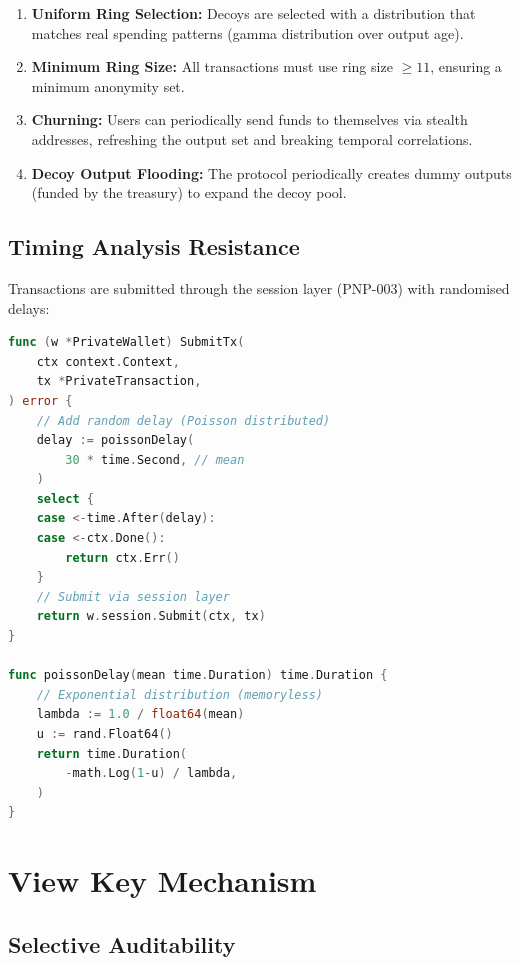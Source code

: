 \documentclass[11pt,a4paper]{article}
\begin{document}
\begin{enumerate}
    \item \textbf{Uniform Ring Selection:} Decoys are selected with a
    distribution that matches real spending patterns
    (gamma distribution over output age).

    \item \textbf{Minimum Ring Size:} All transactions must use ring
    size $\geq 11$, ensuring a minimum anonymity set.

    \item \textbf{Churning:} Users can periodically send funds to
    themselves via stealth addresses, refreshing the output set and
    breaking temporal correlations.

    \item \textbf{Decoy Output Flooding:} The protocol periodically
    creates dummy outputs (funded by the treasury) to expand the decoy
    pool.
\end{enumerate}

\subsection{Timing Analysis Resistance}

Transactions are submitted through the session layer (PNP-003) with
randomised delays:

\begin{lstlisting}[language=Go,caption={Timing Obfuscation}]
func (w *PrivateWallet) SubmitTx(
    ctx context.Context,
    tx *PrivateTransaction,
) error {
    // Add random delay (Poisson distributed)
    delay := poissonDelay(
        30 * time.Second, // mean
    )
    select {
    case <-time.After(delay):
    case <-ctx.Done():
        return ctx.Err()
    }
    // Submit via session layer
    return w.session.Submit(ctx, tx)
}

func poissonDelay(mean time.Duration) time.Duration {
    // Exponential distribution (memoryless)
    lambda := 1.0 / float64(mean)
    u := rand.Float64()
    return time.Duration(
        -math.Log(1-u) / lambda,
    )
}
\end{lstlisting}

\section{View Key Mechanism}
\label{sec:viewkey}

\subsection{Selective Auditability}
\end{document}
